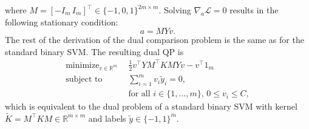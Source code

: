 \documentclass{article}
\newcommand{\RR}{\mathbb R}
\DeclareMathOperator*{\minimize}{minimize}
\begin{document}
where $M=[-I_m \, I_m]^\intercal\in\{-1,0,1\}^{2m\times m}$. Solving
$\nabla_a \mathcal L=0$ results in the following stationary condition:
\begin{equation}
  \label{eq:stationarity}
  a = M Y v.
\end{equation}
The rest of the derivation of the dual comparison problem is the same
as for the standard binary SVM. The resulting dual QP is
\begin{equation}
  \begin{aligned}
    \label{eq:svm-dual}
    \minimize_{v\in\RR^m}\ \ &
    \frac 1 2 v^\intercal Y M^\intercal K M Y v - v^\intercal 1_m\\
    \text{subject to}\ \ &
    \sum_{i=1}^m v_i \tilde y_i = 0,\\
&    \text{for all $i\in\{1,\dots,m\}$, } 0\leq v_i\leq C,
  \end{aligned}
\end{equation}
which is equivalent to the dual problem of a standard binary SVM with
kernel $\tilde K = M^\intercal K M\in\RR^{m\times m}$ and labels
$\tilde y\in\{-1,1\}^m$.
\end{document}
